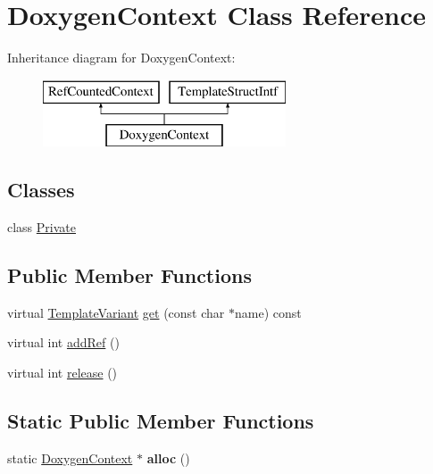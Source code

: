 \hypertarget{class_doxygen_context}{}\section{Doxygen\+Context Class Reference}
\label{class_doxygen_context}
Inheritance diagram for Doxygen\+Context\+:\begin{figure}[H]
\begin{center}
\leavevmode
\includegraphics[height=2.000000cm]{class_doxygen_context}
\end{center}
\end{figure}
\subsection*{Classes}
\begin{DoxyCompactItemize}
\item 
class \mbox{\hyperlink{class_doxygen_context_1_1_private}{Private}}
\end{DoxyCompactItemize}
\subsection*{Public Member Functions}
\begin{DoxyCompactItemize}
\item 
virtual \mbox{\hyperlink{class_template_variant}{Template\+Variant}} \mbox{\hyperlink{class_doxygen_context_ad445e6fcda58749dc680b223b7e5ea2a}{get}} (const char $\ast$name) const
\item 
virtual int \mbox{\hyperlink{class_doxygen_context_a354b9dc7833167a7028074acf11d0974}{add\+Ref}} ()
\item 
virtual int \mbox{\hyperlink{class_doxygen_context_a6121205533d3518b8add76e569f80d10}{release}} ()
\end{DoxyCompactItemize}
\subsection*{Static Public Member Functions}
\begin{DoxyCompactItemize}
\item 
\mbox{\label{class_doxygen_context_acfa6ea631080a61631180a1f6afbac6e}} 
static \mbox{\hyperlink{class_doxygen_context}{Doxygen\+Context}} $\ast$ {\bfseries alloc} ()
\end{DoxyCompactItemize}


